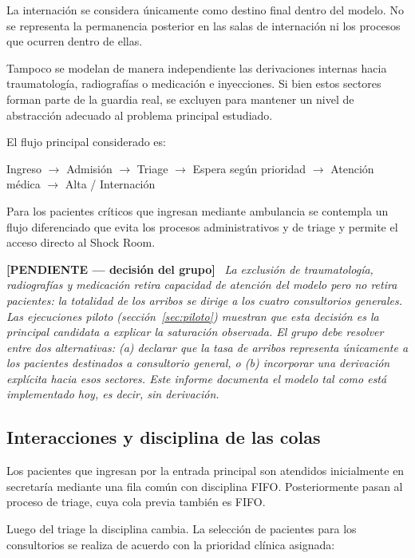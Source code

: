 \documentclass{article}
\newenvironment{pendiente}
  {\par\medskip\noindent\begingroup\color{red!65!black}%
   \textbf{[PENDIENTE — decisión del grupo]}\ \itshape}
  {\endgroup\par\medskip}
\begin{document}
La internación se considera únicamente como destino final dentro del modelo.
No se representa la permanencia posterior en las salas de internación ni los
procesos que ocurren dentro de ellas.

Tampoco se modelan de manera independiente las derivaciones internas hacia
traumatología, radiografías o medicación e inyecciones. Si bien estos
sectores forman parte de la guardia real, se excluyen para mantener un nivel
de abstracción adecuado al problema principal estudiado.

El flujo principal considerado es:

\begin{center}
Ingreso $\rightarrow$ Admisión $\rightarrow$ Triage $\rightarrow$ Espera según
prioridad $\rightarrow$ Atención médica $\rightarrow$ Alta / Internación
\end{center}

Para los pacientes críticos que ingresan mediante ambulancia se contempla un
flujo diferenciado que evita los procesos administrativos y de triage y
permite el acceso directo al Shock Room.

\begin{pendiente}
La exclusión de traumatología, radiografías y medicación retira capacidad de
atención del modelo pero no retira pacientes: la totalidad de los arribos se
dirige a los cuatro consultorios generales. Las ejecuciones piloto
(sección~\ref{sec:piloto}) muestran que esta decisión es la principal
candidata a explicar la saturación observada. El grupo debe resolver entre
dos alternativas: (a) declarar que la tasa de arribos representa únicamente
a los pacientes destinados a consultorio general, o (b) incorporar una
derivación explícita hacia esos sectores. Este informe documenta el modelo
tal como está implementado hoy, es decir, sin derivación.
\end{pendiente}

\subsection{Interacciones y disciplina de las colas}

Los pacientes que ingresan por la entrada principal son atendidos inicialmente
en secretaría mediante una fila común con disciplina FIFO. Posteriormente
pasan al proceso de triage, cuya cola previa también es FIFO.

Luego del triage la disciplina cambia. La selección de pacientes para los
consultorios se realiza de acuerdo con la prioridad clínica asignada:
\end{document}
